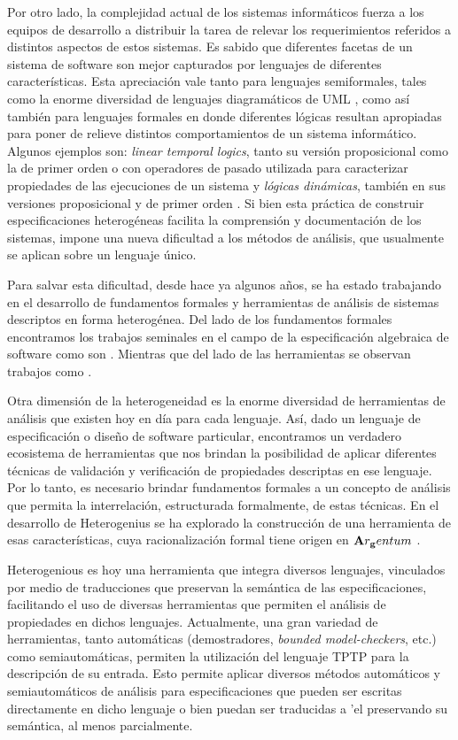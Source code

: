 Por otro lado, la complejidad actual de los sistemas informáticos fuerza a los equipos de desarrollo a distribuir la tarea de relevar los requerimientos referidos a distintos aspectos de estos sistemas. 
Es sabido que diferentes facetas de un sistema de software son mejor capturados por lenguajes de diferentes características. 
Esta apreciación vale tanto para lenguajes semiformales, tales como la enorme diversidad de lenguajes diagramáticos de UML \cite{BRJ98}, como así también para lenguajes formales en donde diferentes lógicas resultan apropiadas para poner de relieve distintos comportamientos de un sistema informático.
Algunos ejemplos son: \emph{linear temporal logics}, tanto su versión proposicional como la de primer orden o con operadores de pasado \cite{Pnu77,MP95} utilizada para caracterizar propiedades de las ejecuciones de un sistema y \emph{lógicas dinámicas}, también en sus versiones proposicional y de primer orden \cite{HKT00}.
Si bien esta práctica de construir especificaciones heterogéneas facilita la comprensión y documentación de los sistemas, impone una nueva dificultad a los métodos de análisis, que usualmente se aplican sobre un lenguaje único.

Para salvar esta dificultad, desde hace ya algunos años, se ha estado trabajando en el desarrollo de fundamentos formales y herramientas de análisis de sistemas descriptos en forma heterogénea. 
Del lado de los fundamentos formales encontramos los trabajos seminales en el campo de la especificación algebraica de software como son \cite{GB84,GB92,Tar96,Dia02}. 
Mientras que del lado de las herramientas se observan trabajos como \cite{Mos02,DF96,DF02,LF06}. 

Otra dimensión de la heterogeneidad es la enorme diversidad de herramientas de análisis que existen hoy en día para cada lenguaje. 
Así, dado un lenguaje de especificación o diseño de software particular, encontramos un verdadero ecosistema de herramientas que nos brindan la posibilidad de aplicar diferentes técnicas de validación y verificación de propiedades descriptas en ese lenguaje.
Por lo tanto, es necesario brindar fundamentos formales a un concepto de análisis que permita la interrelación, estructurada formalmente, de estas técnicas. 
En el desarrollo de Heterogenius \cite{heterogenius} se ha explorado la construcción de una herramienta de esas características, cuya racionalización formal tiene origen en ${\bf A}r_{\bf g}entum$ \cite{FBL01}.

Heterogenious es hoy una herramienta que integra diversos lenguajes, vinculados por medio de traducciones que preservan la semántica de las especificaciones, facilitando el uso de diversas herramientas que permiten el análisis de propiedades en dichos lenguajes. Actualmente, una gran variedad de herramientas, tanto automáticas (demostradores, \emph{bounded model-checkers}, etc.) como semiautomáticas, permiten la utilización del lenguaje TPTP \cite{tptp} para la descripción de su entrada.
Esto permite aplicar diversos métodos automáticos y semiautomáticos de análisis para especificaciones que pueden ser escritas directamente en dicho lenguaje o bien puedan ser traducidas a 'el preservando su semántica, al menos parcialmente.

